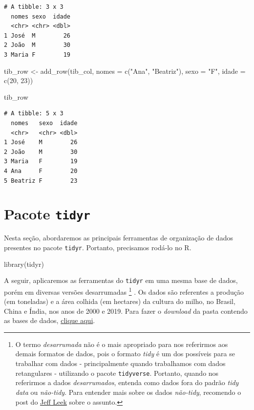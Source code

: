 \documentclass[
  brazilian,
]{book}
\newenvironment{Shaded}{\begin{snugshade}}{\end{snugshade}}
\newcommand{\AttributeTok}[1]{\textcolor[rgb]{0.77,0.63,0.00}{#1}}
\newcommand{\DecValTok}[1]{\textcolor[rgb]{0.00,0.00,0.81}{#1}}
\newcommand{\FunctionTok}[1]{\textcolor[rgb]{0.00,0.00,0.00}{#1}}
\newcommand{\NormalTok}[1]{#1}
\newcommand{\OtherTok}[1]{\textcolor[rgb]{0.56,0.35,0.01}{#1}}
\newcommand{\StringTok}[1]{\textcolor[rgb]{0.31,0.60,0.02}{#1}}
\begin{document}
\begin{verbatim}
# A tibble: 3 x 3
  nomes sexo  idade
  <chr> <chr> <dbl>
1 José  M        26
2 João  M        30
3 Maria F        19
\end{verbatim}

\begin{Shaded}
\begin{Highlighting}[]
\NormalTok{tib\_row }\OtherTok{\textless{}{-}} \FunctionTok{add\_row}\NormalTok{(tib\_col,}
                   \AttributeTok{nomes =} \FunctionTok{c}\NormalTok{(}\StringTok{"Ana"}\NormalTok{, }\StringTok{"Beatriz"}\NormalTok{),}
                   \AttributeTok{sexo =} \StringTok{"F"}\NormalTok{,}
                   \AttributeTok{idade =} \FunctionTok{c}\NormalTok{(}\DecValTok{20}\NormalTok{, }\DecValTok{23}\NormalTok{))}

\NormalTok{tib\_row}
\end{Highlighting}
\end{Shaded}

\begin{verbatim}
# A tibble: 5 x 3
  nomes   sexo  idade
  <chr>   <chr> <dbl>
1 José    M        26
2 João    M        30
3 Maria   F        19
4 Ana     F        20
5 Beatriz F        23
\end{verbatim}

\hypertarget{pacote-tidyr}{%
\section{\texorpdfstring{Pacote \texttt{tidyr}}{Pacote tidyr}}\label{pacote-tidyr}}

Nesta seção, abordaremos as principais ferramentas de organização de dados presentes no pacote \texttt{tidyr}. Portanto, precisamos rodá-lo no R.

\begin{Shaded}
\begin{Highlighting}[]
\FunctionTok{library}\NormalTok{(tidyr)}
\end{Highlighting}
\end{Shaded}

A seguir, aplicaremos as ferramentas do \texttt{tidyr} em uma mesma base de dados, porém em diversas versões desarrumadas \footnote{O termo \emph{desarrumada} não é o mais apropriado para nos referirmos aos demais formatos de dados, pois o formato \emph{tidy} é um dos possíveis para se trabalhar com dados - principalmente quando trabalhamos com dados retangulares - utilizando o pacote \texttt{tidyverse}. Portanto, quando nos referirmos a dados \emph{desarrumados}, entenda como dados fora do padrão \emph{tidy data} ou \emph{não-tidy}. Para entender mais sobre os dados \emph{não-tidy}, recomendo o post do \href{https://simplystatistics.org/posts/2016-02-17-non-tidy-data/}{Jeff Leek} sobre o assunto.} . Os dados são referentes a produção (em toneladas) e a área colhida (em hectares) da cultura do milho, no Brasil, China e Índia, nos anos de 2000 e 2019. Para fazer o \emph{download} da pasta contendo as bases de dados, \href{https://github.com/gustavojy/ApostilaCD-R/blob/main/dados_zip/dados_tidy.zip?raw=true}{clique aqui}.
\end{document}
